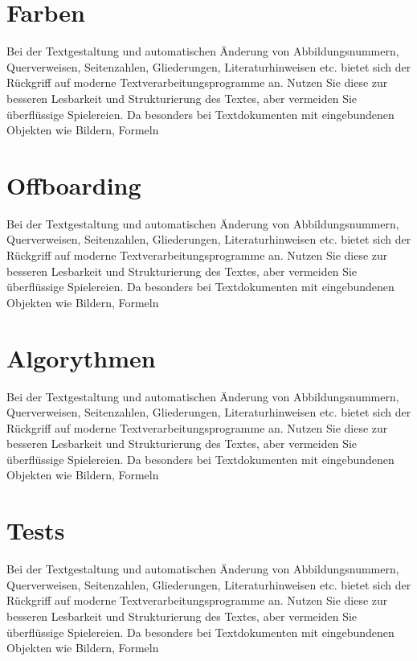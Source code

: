 \section{Farben}
Bei der Textgestaltung und automatischen Änderung von Abbildungsnummern, Querverweisen,
Seitenzahlen, Gliederungen, Literaturhinweisen etc. bietet sich der Rückgriff
auf moderne Textverarbeitungsprogramme an. Nutzen Sie diese zur besseren Lesbarkeit
und Strukturierung des Textes, aber vermeiden Sie überflüssige Spielereien. Da
besonders bei Textdokumenten mit eingebundenen Objekten wie Bildern, Formeln

\section{Offboarding}
Bei der Textgestaltung und automatischen Änderung von Abbildungsnummern, Querverweisen,
Seitenzahlen, Gliederungen, Literaturhinweisen etc. bietet sich der Rückgriff
auf moderne Textverarbeitungsprogramme an. Nutzen Sie diese zur besseren Lesbarkeit
und Strukturierung des Textes, aber vermeiden Sie überflüssige Spielereien. Da
besonders bei Textdokumenten mit eingebundenen Objekten wie Bildern, Formeln

\section{Algorythmen}
Bei der Textgestaltung und automatischen Änderung von Abbildungsnummern, Querverweisen,
Seitenzahlen, Gliederungen, Literaturhinweisen etc. bietet sich der Rückgriff
auf moderne Textverarbeitungsprogramme an. Nutzen Sie diese zur besseren Lesbarkeit
und Strukturierung des Textes, aber vermeiden Sie überflüssige Spielereien. Da
besonders bei Textdokumenten mit eingebundenen Objekten wie Bildern, Formeln

\section{Tests}
Bei der Textgestaltung und automatischen Änderung von Abbildungsnummern, Querverweisen,
Seitenzahlen, Gliederungen, Literaturhinweisen etc. bietet sich der Rückgriff
auf moderne Textverarbeitungsprogramme an. Nutzen Sie diese zur besseren Lesbarkeit
und Strukturierung des Textes, aber vermeiden Sie überflüssige Spielereien. Da
besonders bei Textdokumenten mit eingebundenen Objekten wie Bildern, Formeln
